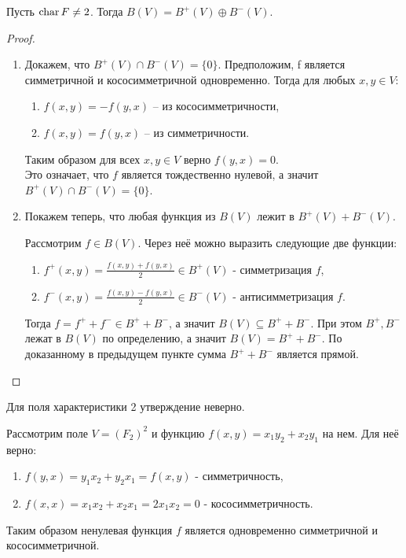 \begin{proposition}
    Пусть $\operatorname{char} F \neq 2$. Тогда $B(V) = B^+ (V) \oplus B^- (V)$.
\end{proposition}

\begin{proof}~
    \begin{enumerate}
        \item Докажем, что $B^+(V) \cap B^-(V) = \{0\}$. Предположим, f является симметричной 
        и кососимметричной одновременно. Тогда для любых $x, y \in V$: 
        \begin{enumerate}
            \item $f(x, y) =  - f(y, x)$ -- из кососимметричности,
            \item $f(x, y) = f(y, x)$ -- из симметричности.
        \end{enumerate}
        Таким образом для всех $x, y \in V$ верно $f(y, x) = 0$. \\ Это означает, что $f$ является 
        тождественно нулевой, а значит $B^+(V) \cap B^-(V) = \{0\}$.

        \item Покажем теперь, что любая функция из $B(V)$ лежит в $B^+(V) + B^-(V)$. 
        
        Рассмотрим $f \in B(V)$. Через неё можно выразить следующие две функции: 
        \begin{enumerate}
            \item $f^+(x, y) = \frac{f(x, y) + f(y, x)}{2} \in B^+(V)$ - симметризация $f$,
            \item $f^-(x, y) = \frac{f(x, y) - f(y, x)}{2} \in B^-(V)$ - антисимметризация $f$.
        \end{enumerate} 
        Тогда $f = f^+ + f^- \in B^+ + B^-$, а значит $B(V) \subseteq B^+ + B^-$. При этом 
        $B^+, B^-$ лежат в $B(V)$ по определению, а значит $B(V) = B^+ + B^-$. 
        По доказанному в предыдущем пункте сумма $B^+ + B^-$ является прямой.
    \end{enumerate}
\end{proof}

\begin{note}
    Для поля характеристики 2 утверждение неверно.
\end{note}

\begin{example}
    Рассмотрим поле $V = (F_2)^2$ и функцию $f(x, y) = x_1 y_2 + x_2 y_1$ на нем. Для неё верно: 
    \begin{enumerate}
        \item $f(y, x) = y_1 x_2 + y_2 x_1 = f(x, y)$ - симметричность,
        \item $f(x, x) = x_1 x_2 + x_2 x_1 = 2 x_1 x_2 = 0$ - кососимметричность.
    \end{enumerate}
    Таким образом ненулевая функция $f$ является одновременно симметричной и кососимметричной.
\end{example}

